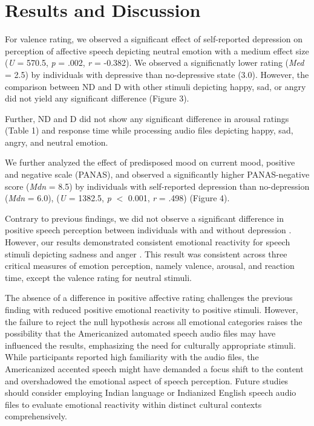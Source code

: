 \documentclass{Interspeech2024}
\begin{document}
\section{Results and Discussion}

For valence rating, we observed a significant effect of self-reported depression on perception of affective speech depicting neutral emotion with a medium effect size (\textit{U} = 570.5, \textit{p} = .002, \textit{r} = -0.382). We observed a significnatly lower rating (\textit{Med} = 2.5) by individuals with depressive than no-depressive state (3.0).  However, the comparison between ND and D with other stimuli depicting happy, sad, or angry did not yield any significant difference (Figure 3). 

Further, ND and D did not show any significant difference in arousal ratings (Table 1) and response time while processing audio files depicting happy, sad, angry, and neutral emotion. 

We further analyzed the effect of predisposed mood on current mood, positive and negative scale (PANAS), and observed a significantly higher PANAS-negative score (\textit{Mdn} = 8.5) by individuals with self-reported depression than no-depression (\textit{Mdn} = 6.0), (\textit{U} = 1382.5, \textit{p} $<$ 0.001, \textit{r} = .498) (Figure 4). 

Contrary to previous findings, we did not observe a significant difference in positive speech perception between individuals with and without depression \cite{uekermann2008perception, Sheoran2022, Bylsma2008,   koch2018neural, schlipf2013judgment}. However, our results demonstrated consistent emotional reactivity for speech stimuli depicting sadness and anger \cite{uekermann2008perception, koch2018neural}. This result was consistent across three critical measures of emotion perception, namely valence, arousal, and reaction time, except the valence rating for neutral stimuli. 

The absence of a difference in positive affective rating challenges the previous finding with reduced positive emotional reactivity to positive stimuli. However, the failure to reject the null hypothesis across all emotional categories raises the possibility that the Americanized automated speech audio files may have influenced the results, emphasizing the need for culturally appropriate stimuli. While participants reported high familiarity with the audio files, the Americanized accented speech might have demanded a focus shift to the content and overshadowed the emotional aspect of speech perception. Future studies should consider employing Indian language or Indianized English speech audio files to evaluate emotional reactivity within distinct cultural contexts comprehensively.
\end{document}
